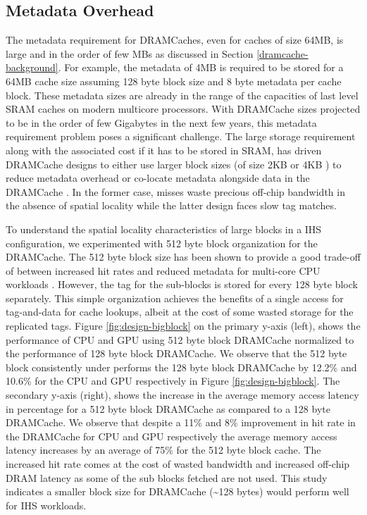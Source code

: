 \subsection{Metadata Overhead}
The metadata requirement for DRAMCaches, even for caches of size 64MB, is large and in the order of few MBs as discussed in Section \ref{dramcache-background}. For example, the metadata of 4MB is required to be stored for a 64MB cache size assuming 128 byte block size and 8 byte metadata per cache block. These metadata sizes are  already in the range of the capacities of last level SRAM caches on modern multicore processors. With DRAMCache sizes projected to be in the order of few Gigabytes in the next few years, this metadata requirement problem poses a significant challenge. The large storage requirement along with the associated cost if it has to be stored in SRAM, has driven DRAMCache designs to either use larger block sizes (of size 2KB or 4KB \cite{footprint,unison-cache}) to reduce metadata overhead or co-locate metadata alongside data in the DRAMCache \cite{loh-hill,alloy,atcache}. 
In the former case, misses waste precious off-chip bandwidth in the absence of spatial locality while the latter design faces slow tag matches.
\par To understand the spatial locality characteristics of large blocks in a IHS configuration, we experimented with 512 byte block organization for the DRAMCache. The 512 byte block size has been shown to provide a good trade-off of between increased hit rates and reduced metadata for multi-core CPU workloads \cite{bimodal}.
However, the tag for the sub-blocks is stored for every 128 byte block separately. This simple organization achieves the benefits of a single access for tag-and-data \cite{alloy} for cache lookups, albeit at the cost of some wasted storage for the replicated tags. Figure \ref{fig:design-bigblock} on the primary y-axis (left), shows the performance of CPU and GPU using 512 byte block DRAMCache normalized to the performance of 128 byte block DRAMCache. We observe that the 512 byte block consistently under performs the 128 byte block DRAMCache by 12.2\% and 10.6\% for the CPU and GPU respectively in Figure \ref{fig:design-bigblock}. The secondary y-axis (right), shows the increase in the average memory access latency in percentage for a 512 byte block DRAMCache as compared to a 128 byte DRAMCache. We observe that despite a 11\% and 8\% improvement in hit rate in the DRAMCache for CPU and GPU respectively the average memory access latency increases by an average of 75\% for the 512 byte block cache. The increased hit rate comes at the cost of wasted bandwidth and increased off-chip DRAM latency as some of the sub blocks fetched are not used. This study indicates a smaller block size for DRAMCache (\textasciitilde128 bytes) would perform well for IHS workloads.
